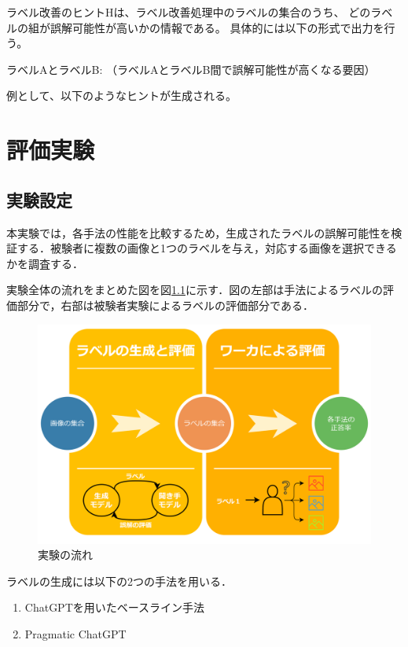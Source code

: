 \documentclass[a4paper,11pt]{jreport}
\begin{document}
ラベル改善のヒントHは、ラベル改善処理中のラベルの集合のうち、
どのラベルの組が誤解可能性が高いかの情報である。
具体的には以下の形式で出力を行う。

ラベルAとラベルB: （ラベルAとラベルB間で誤解可能性が高くなる要因）

例として、以下のようなヒントが生成される。


\chapter{評価実験}

\section{実験設定}

本実験では，各手法の性能を比較するため，生成されたラベルの誤解可能性を検証する．被験者に複数の画像と1つのラベルを与え，対応する画像を選択できるかを調査する．

実験全体の流れをまとめた図を図\ref{fig:flow_example}に示す．図の左部は手法によるラベルの評価部分で，右部は被験者実験によるラベルの評価部分である．

\begin{figure}[H]
  \centering
  \includegraphics[width=\linewidth]{figures/flow.png}
  \caption{実験の流れ}
  \label{fig:flow_example}
\end{figure}


ラベルの生成には以下の2つの手法を用いる．
\begin{enumerate}
    \item ChatGPTを用いたベースライン手法
    \item Pragmatic ChatGPT
\end{enumerate}
\end{document}
